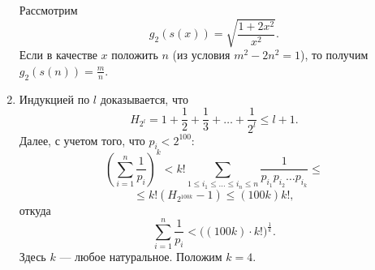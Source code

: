 \documentclass[11pt, a4paper]{article}
\begin{document}
\begin{enumerate}
Рассмотрим 
$$g_2(s(x)) = \sqrt{\frac{1+2x^2}{x^2}}.$$
Если в качестве $x$ положить $n$ (из условия $m^2 - 2n^2 = 1$), то получим $g_2(s(n)) = \frac{m}{n}$.

\item Индукцией по $l$ доказывается, что
$$H_{2^l} = 1 + \frac{1}{2} + \frac{1}{3} + \hdots + \frac{1}{2^l} \leqslant l + 1.$$
Далее, с учетом того, что $p_i < 2^{100}$:
$$\left( \sum_{i=1}^{n} \frac{1}{p_i} \right)^k < k! \sum_{1 \leqslant i_1 \leqslant \hdots \leqslant i_n \leqslant n} \frac{1}{p_{i_1} p_{i_2} \hdots p_{i_k}} \leqslant $$
$$ \leqslant k! ( H_{2^{100k}} - 1) \leqslant (100 k) k!,$$
откуда
$$\sum_{i=1}^{n} \frac{1}{p_i} < \bigl( (100 k) \cdot k! \bigr) ^{\frac{1}{k}}.$$
Здесь $k$ --- любое натуральное. Положим $k = 4$.
\end{enumerate}
\end{document}
